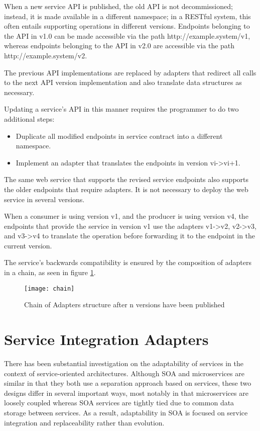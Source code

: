 When a new service API is published, the old API is not decommissioned;
instead, it is made available in a different namespace;
in a RESTful system, this often entails supporting operations in different versions.
Endpoints belonging to the API in v1.0 can be made accessible via the path http://example.system/v1,
whereas endpoints belonging to the API in v2.0 are accessible via the path http://example.system/v2.

The previous API implementations are replaced by adapters that redirect all calls to the next API version implementation and also translate data structures as necessary.

Updating a service's API in this manner requires the programmer to do two additional steps:
\begin{itemize}
    \item Duplicate all modified endpoints in service contract into a different namespace.
    \item Implement an adapter that translates the endpoints in version vi->vi+1.
\end{itemize}

The same web service that supports the revised service endpoints also supports the older endpoints that require adapters.
It is not necessary to deploy the web service in several versions.

When a consumer is using version v1, and the producer is using version v4, the endpoints that provide the service in version v1 use the adapters v1->v2, v2->v3, and v3->v4 to translate the operation before forwarding it to the endpoint in the current version.

The service's backwards compatibility is ensured by the composition of adapters in a chain, as seen in figure \ref{fig:chain}.

\begin{figure}[htbp]
    \centering
    \texttt{[image: chain]}
    \caption{Chain of Adapters structure
    after n versions have been published }
    \label{fig:chain}
\end{figure}

\section{Service Integration Adapters} %
\label{sec:service_integration_adapters}

There has been substantial investigation on the adaptability of services in the context of service-oriented architectures.
Although SOA and microservices are similar in that they both use a separation approach based on services,
these two designs differ in several important ways, most notably in that microservices are loosely coupled whereas SOA services are tightly tied due to common data storage between services.
As a result, adaptability in SOA is focused on service integration and replaceability rather than evolution.

